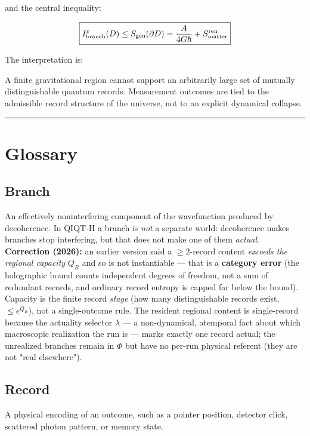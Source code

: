 \documentclass[11pt,a4paper]{article}
\newenvironment{qiqtquote}{\begin{mdframed}[style=quotestyle]}{\end{mdframed}}
\begin{document}
and the central inequality:

\[
\boxed{
I_{\rm branch}^{\varepsilon}(D)
\leq
S_{\rm gen}(\partial D)
=
\frac{A}{4G\hbar}
+
S_{\rm matter}^{\rm ren}
}
\]

The interpretation is:

\begin{qiqtquote}
A finite gravitational region cannot support an arbitrarily large set of mutually distinguishable quantum records. Measurement outcomes are tied to the admissible record structure of the universe, not to an explicit dynamical collapse.
\end{qiqtquote}

\medskip\hrule\medskip

\section{Glossary}

\subsection{Branch}

An effectively noninterfering component of the wavefunction produced by decoherence. In QIQT-H a branch is \emph{not} a separate world: decoherence makes branches stop interfering, but that does not make one of them \emph{actual}. \textbf{Correction (2026):} an earlier version said a $\ge 2$-record content \emph{exceeds the regional capacity} $Q_R$ and so is not instantiable — that is a \textbf{category error} (the holographic bound counts independent degrees of freedom, not a sum of redundant records, and ordinary record entropy is capped far below the bound). Capacity is the finite record \emph{stage} (how many distinguishable records exist, $\le e^{Q_R}$), not a single-outcome rule. The resident regional content is single-record because the actuality selector $\lambda$ — a non-dynamical, atemporal fact about which macroscopic realization the run is — marks exactly one record actual; the unrealized branches remain in $\Phi$ but have no per-run physical referent (they are not "real elsewhere").

\subsection{Record}

A physical encoding of an outcome, such as a pointer position, detector click, scattered photon pattern, or memory state.
\end{document}

